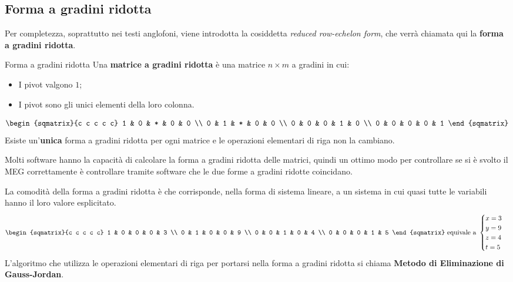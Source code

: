\subsection{Forma a gradini ridotta}
Per completezza, soprattutto nei testi anglofoni, viene introdotta la cosiddetta \textit{reduced row-echelon form}, che verrà chiamata qui la \textbf{forma a gradini ridotta}.
\begin{newdef}{Forma a gradini ridotta}
    Una \textbf{matrice a gradini ridotta} è una matrice $n \times m$ a gradini in cui:
    \begin{itemize}
        \item I pivot valgono $1$;
        \item I pivot sono gli unici elementi della loro colonna.
    \end{itemize}
    \[
        \begin{sqmatrix}{c c c c c}
            1 & 0 & * & 0 & 0 \\
            0 & 1 & * & 0 & 0 \\
            0 & 0 & 0 & 1 & 0 \\
            0 & 0 & 0 & 0 & 1
        \end{sqmatrix}
    \]
    Esiste un'\textbf{unica} forma a gradini ridotta per ogni matrice e le operazioni elementari di riga non la cambiano.
\end{newdef}
\begin{nb}
    Molti software hanno la capacità di calcolare la forma a gradini ridotta delle matrici, quindi un ottimo modo per controllare se si è svolto il MEG correttamente è controllare tramite software che le due forme a gradini ridotte coincidano.
\end{nb}
La comodità della forma a gradini ridotta è che corrisponde, nella forma di sistema lineare, a un sistema in cui quasi tutte le variabili hanno il loro valore esplicitato.
\[
    \begin{sqmatrix}{c c c c c}
        1 & 0 & 0 & 0 & 3 \\
        0 & 1 & 0 & 0 & 9 \\
        0 & 0 & 1 & 0 & 4 \\
        0 & 0 & 0 & 1 & 5
    \end{sqmatrix}
    \text{ equivale a }
    \begin{cases}
        x = 3 \\
        y = 9 \\
        z = 4 \\
        t = 5
    \end{cases}
\]
L'algoritmo che utilizza le operazioni elementari di riga per portarsi nella forma a gradini ridotta si chiama \textbf{Metodo di Eliminazione di Gauss-Jordan}.

